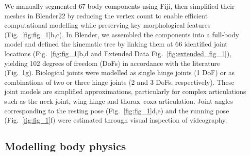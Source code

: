\documentclass[sn-mathphys-num]{sn-jnl}%
\theoremstyle{thmstyleone}%
\theoremstyle{thmstyletwo}%
\theoremstyle{thmstylethree}%
\begin{document}
We manually segmented 67 body components using Fiji\cite{schindelin2012fiji}, then simplified their meshes in Blender22 by reducing the vertex count to enable efficient computational modelling while preserving key morphological features (Fig.~\ref{fig:fig_1}b,c). 
In Blender, we assembled the components into a full-body model and defined the kinematic tree by linking them at 66 identified joint locations (Fig.~\ref{fig:fig_1}b,d and Extended Data Fig.~\ref{fig:extended_fig_1}), yielding 102 degrees of freedom (DoFs) in accordance with the literature (Fig. 1g). 
Biological joints were modelled as single hinge joints (1 DoF) or as combinations of two or three hinge joints (2 and 3 DoFs, respectively). 
These joint models are simplified approximations, particularly for complex articulations such as the neck joint, wing hinge and thorax–coxa articulation\cite{melis2024machine,strausfeld1987neck,gorko2024motor}. 
Joint angles corresponding to the resting pose (Fig.~\ref{fig:fig_1}d,e) and the running pose (Fig.~\ref{fig:fig_1}f) were estimated through visual inspection of videography.



\subsection{Modelling body physics} \label{sec:preferred}
\end{document}
